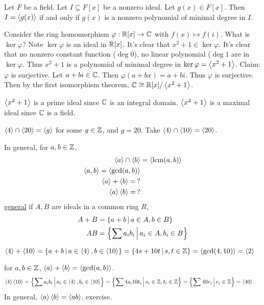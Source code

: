 \documentclass[]{article}
\begin{document}
\begin{theorem}
	Let $F$ be a field. Let $I\subseteq F[x]$ be a nonzero ideal. Let $g(x)\in F[x]$.
	Then $I=\gen{g(x)}$ if and only if $g(x)$ is a nonzero polynomial of minimal degree in $I$.
\end{theorem}
\begin{example}
	Consider the ring homomorphism $\varphi:\mb R[x]\ra\mb C$ with $f(x)\mapsto f(i)$.
	What is $\ker\varphi$? Note $\ker\varphi$ is an ideal in $\mb R[x]$.
	It's clear that $x^2+1\in\ker\varphi$. It's clear that no nonzero constant function ($\deg 0$), no linear polynomial ($\deg1$ are in $\ker\varphi$.
	Thus $x^2+1$ is a polynomial of minimal degree in $\ker\varphi=\gen{x^2+1}$.
	Claim: $\varphi$ is surjective. Let $a+bi\in\mb C$. Then $\varphi(a+bx)=a+bi$.
	Thus $\varphi$ is surjective.
	Then by the first isomorphism theorem, $\mb C\cong\mb R[x]/\gen{x^2+1}$.
	\begin{note}
		$\gen{x^2+1}$ is a prime ideal since $\mb C$ is an integral domain.
		$\gen{x^2+1}$ is a maximal ideal since $\mb C$ is a field.
	\end{note}
\end{example}
\begin{example}
	[$R=\mb Z$] $\gen4\cap\gen{20}=\gen g$ for some $g\in\mb Z$, and $g=20$.
	Take $\gen4\cap\gen{10}=\gen{20}$.
\end{example}
In general, for $a,b\in\mb Z$,
\begin{align*}
	\gen a\cap\gen b &=\gen{\text{lcm}(a,b)} \\
	\gen{a,b}=\gen{\gcd(a,b)} \\
	\gen a+\gen b = \, ? \\
	\gen a\gen b = \, ?
\end{align*}
\ul{general}
if $A,B$ are ideals in a common ring $R$,
\begin{align*}
	A+B &= \setm{a+b}{a\in A,b\in B} \\
	AB &= \setm{\sum a_ib_i}{a_i\in A,b_i\in B}
\end{align*}
\begin{example}
	[$R=\mb Z$] $\gen4+\gen{10} = \setm{a+b}{a\in\gen4,b\in\gen{10}} = \setm{4s+10t}{s,t\in\mb Z} = \gen{\gcd(4,10)} = \gen2$
\end{example}
for $a,b\in\mb Z$, $\gen a+\gen b=\gen{\gcd(a,b)}$.
\begin{align*}
	\gen4\gen{10} &= \setm{\sum a_ib_i}{a_i\in\gen4,b_i\in\gen{10}} = \setm{\sum4s_i10t_i}{s_i\in\mb Z,t_i\in\mb Z} = \setm{\sum40r_i}{r_i\in\mb Z}=\gen{40}.
\end{align*}
In general, $\gen a\gen b=\gen{ab}$. exercise.
\end{document}
